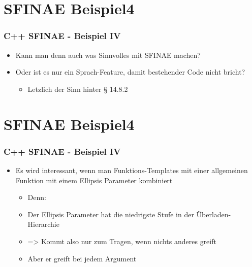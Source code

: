 \documentclass{beamer}
\begin{document}
\section{SFINAE Beispiel4}
\begin{frame}[fragile]
\frametitle{C++ SFINAE - Beispiel IV}

\begin{itemize}
\item Kann man denn auch was Sinnvolles mit SFINAE machen?
\item Oder ist es nur ein Sprach-Feature, damit bestehender Code nicht bricht?
\begin{itemize}
\item Letzlich der Sinn hinter § 14.8.2
\end{itemize}

\end{itemize}
\end{frame}



\section{SFINAE Beispiel4}
\begin{frame}[fragile]
\frametitle{C++ SFINAE - Beispiel IV}

\begin{itemize}
\item Es wird interessant, wenn man Funktions-Templates mit einer allgemeinen Funktion mit einem Ellipsis Parameter kombiniert
\begin{itemize}
\item Denn: 
\item Der Ellipsis Parameter hat die niedrigste Stufe in der Überladen-Hierarchie
\item => Kommt also nur zum Tragen, wenn nichts anderes greift
\item Aber er greift bei jedem Argument
\end{itemize}

\end{itemize}
\end{frame}
\end{document}
